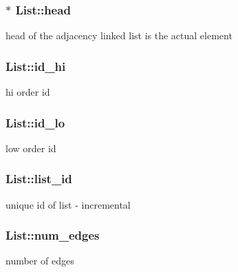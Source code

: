 \subsubsection[{\texorpdfstring{head}{head}}]{$\ast$ List\+::head}\hypertarget{structList_a6ea62266a29cafe9244d1388ed8feaab}{}\label{structList_a6ea62266a29cafe9244d1388ed8feaab}
head of the adjacency linked list is the actual element 
\subsubsection[{\texorpdfstring{id\+\_\+hi}{id_hi}}]{ List\+::id\+\_\+hi}\hypertarget{structList_a16979de39b14c5f20b993dd039e3df54}{}\label{structList_a16979de39b14c5f20b993dd039e3df54}
hi order id 
\subsubsection[{\texorpdfstring{id\+\_\+lo}{id_lo}}]{ List\+::id\+\_\+lo}\hypertarget{structList_a747f801d0a265be040e9277a9328ae99}{}\label{structList_a747f801d0a265be040e9277a9328ae99}
low order id 
\subsubsection[{\texorpdfstring{list\+\_\+id}{list_id}}]{ List\+::list\+\_\+id}\hypertarget{structList_ad361603380931b7a2b04e4b367525f80}{}\label{structList_ad361603380931b7a2b04e4b367525f80}
unique id of list -\/ incremental 
\subsubsection[{\texorpdfstring{num\+\_\+edges}{num_edges}}]{ List\+::num\+\_\+edges}\hypertarget{structList_a057ef7e4f38226d61b1069edfc54eb55}{}\label{structList_a057ef7e4f38226d61b1069edfc54eb55}
number of edges 
